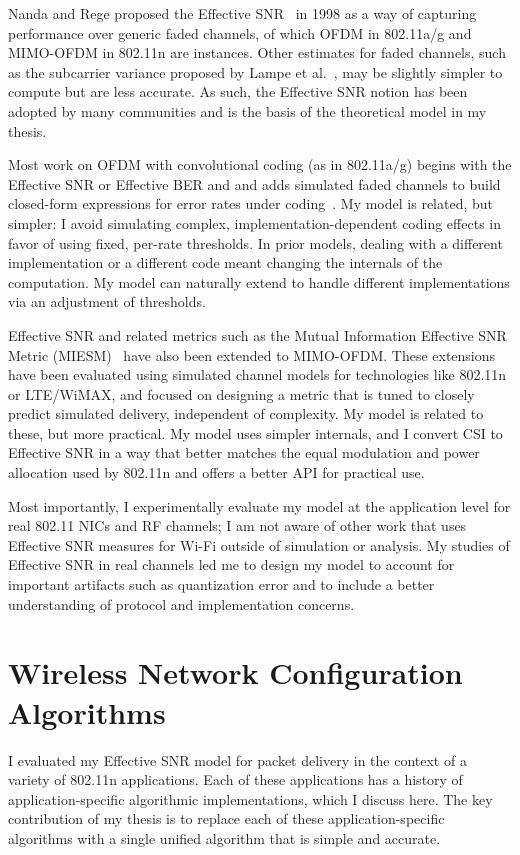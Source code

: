 Nanda and Rege proposed the Effective SNR~\cite{Nanda_EffectiveSNR} in 1998 as a way of capturing performance over generic faded channels, of which OFDM in 802.11a/g and MIMO-OFDM in 802.11n are instances. Other estimates for faded channels, such as the subcarrier variance proposed by Lampe et al.~\cite{Lampe_adaptation}, may be slightly simpler to compute but are less accurate. As such, the Effective SNR notion has been adopted by many communities and is the basis of the theoretical model in my thesis.

Most work on OFDM with convolutional coding (as in 802.11a/g) begins with the Effective SNR or Effective BER and and adds simulated faded channels to build closed-form expressions for error rates under coding~\cite{Awoniyi_ofdm,Nortel_3g,Tralli_convolutional}. My model is related, but simpler: I avoid simulating complex, implementation-dependent coding effects in favor of using fixed, per-rate thresholds. In prior models, dealing with a different implementation or a different code meant changing the internals of the computation. My model can naturally extend to handle different implementations via an adjustment of thresholds.

Effective SNR and related metrics such as the Mutual Information Effective SNR Metric (MIESM)~\cite{He_MIESM,Liu_EESM,Kant_FLA,Jensen_FLA,Martorell_11n} have also been extended to MIMO-OFDM. These extensions have been evaluated using simulated channel models for technologies like 802.11n or LTE/WiMAX, and focused on designing a metric that is tuned to closely predict simulated delivery, independent of complexity. My model is related to these, but more practical. My model uses simpler internals, and I convert CSI to Effective SNR in a way that better matches the equal modulation and power allocation used by 802.11n and offers a better API for practical use.

Most importantly, I experimentally evaluate my model at the application level for real 802.11 NICs and RF channels; I am not aware of other work that uses Effective SNR measures for Wi-Fi outside of simulation or analysis. My studies of Effective SNR in real channels led me to design my model to account for important artifacts such as quantization error and to include a better understanding of protocol and implementation concerns.

\section{Wireless Network Configuration Algorithms}
I evaluated my Effective SNR model for packet delivery in the context of a variety of 802.11n applications. Each of these applications has a history of application-specific algorithmic implementations, which I discuss here. The key contribution of my thesis is to replace each of these application-specific algorithms with a single unified algorithm that is simple and accurate.

